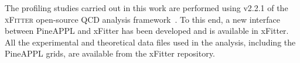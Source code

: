 The profiling studies carried out in this work are performed using v2.2.1 of the \textsc{xFitter} open-source QCD analysis framework~\cite{Alekhin:2014irh, Bertone:2017tig, xFitter:2022zjb, xFitter:web}.
%
To this end, a new interface between  {\sc\small PineAPPL} and {\sc\small xFitter} has been developed and is available in {\sc\small xFitter}.
%
All the experimental and theoretical data files used in the analysis, including
the  {\sc\small PineAPPL}  grids, are available
from the {\sc\small xFitter} repository.




